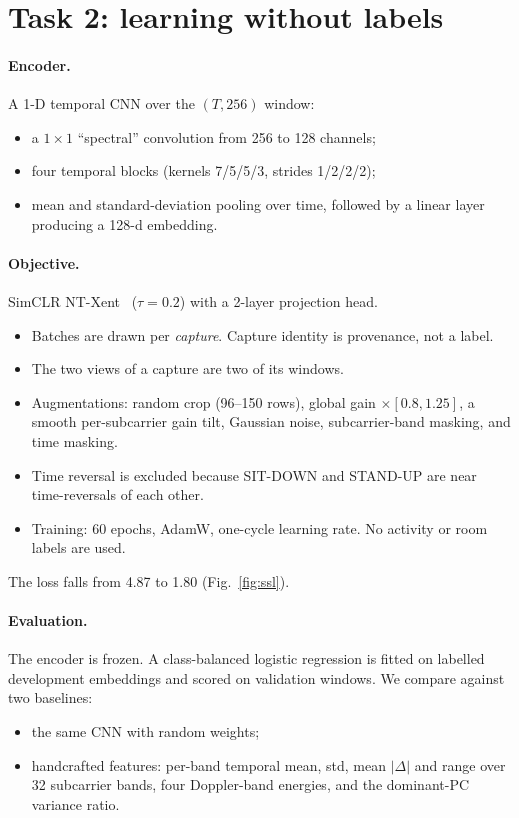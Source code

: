 \documentclass[11pt,a4paper]{article}
\begin{document}
\section{Task 2: learning without labels}

\paragraph{Encoder.} A 1-D temporal CNN over the $(T,256)$ window:
\begin{itemize}
  \item a $1\times1$ ``spectral'' convolution from 256 to 128 channels;
  \item four temporal blocks (kernels 7/5/5/3, strides 1/2/2/2);
  \item mean and standard-deviation pooling over time, followed by a linear layer producing a 128-d embedding.
\end{itemize}

\paragraph{Objective.} SimCLR NT-Xent~\cite{simclr} ($\tau=0.2$) with a 2-layer projection head.
\begin{itemize}
  \item Batches are drawn per \emph{capture}. Capture identity is provenance, not a label.
  \item The two views of a capture are two of its windows.
  \item Augmentations: random crop (96--150 rows), global gain $\times[0.8,1.25]$, a smooth per-subcarrier gain tilt, Gaussian noise, subcarrier-band masking, and time masking.
  \item Time reversal is excluded because SIT-DOWN and STAND-UP are near time-reversals of each other.
  \item Training: 60 epochs, AdamW, one-cycle learning rate. No activity or room labels are used.
\end{itemize}
The loss falls from 4.87 to 1.80 (Fig.~\ref{fig:ssl}).

\paragraph{Evaluation.} The encoder is frozen. A class-balanced logistic regression is fitted on labelled development embeddings and scored on validation windows. We compare against two baselines:
\begin{itemize}
  \item the same CNN with random weights;
  \item handcrafted features: per-band temporal mean, std, mean $|\Delta|$ and range over 32 subcarrier bands, four Doppler-band energies, and the dominant-PC variance ratio.
\end{itemize}
\end{document}
